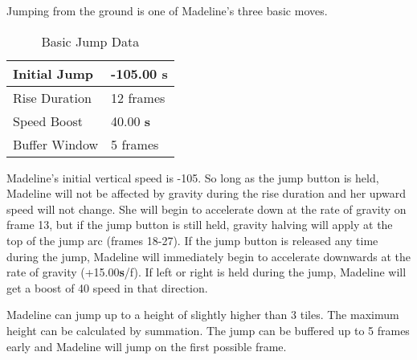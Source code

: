 \documentclass[oneside]{book}
\newcommand{\s}{\textbf{s}}
\begin{document}
Jumping from the ground is one of Madeline's three basic moves.

\begin{table}[h]
\begin{tabular}{|l|l|}
\hline
Initial Jump&-105.00 \s\\
\hline
Rise Duration&12 frames\\
\hline
Speed Boost&40.00 \s\\

\hline
Buffer Window&5 frames\\
\hline
\end{tabular} 
\caption{Basic Jump Data}
\end{table}



\begin{comment}
\begin{table}[h]
\begin{tabular}{|l|l|}
\hline
Frame&Y Speed\\
\hline
1-12&-105.00 \s\\
\hline
13-17&+15.00 \s/f (to -30.00 \s)\\
\hline
18-21&+7.50 \s/f (to 0.00 \s)\\
\hline
22-27&+7.50 \s/f (to +45.00 \s)\\
\hline
28-34&+15.00 \s/f (to +150.00 \s)\\
\hline
35&+10.00 \s/f (to +160.00 \s)\\
\hline
35-38&+160.00 \s\\
\hline
39&Land\\
\hline
\end{tabular}
\caption{Vertical Jump Speeds}
\end{table}
\end{comment}

Madeline's initial vertical speed is -105. So long as the jump button is held, Madeline will not be affected by gravity during the rise duration and her upward speed will not change. She will begin to accelerate down at the rate of gravity on frame 13, but if the jump button is still held, gravity halving will apply at the top of the jump arc (frames 18-27). If the jump button is released any time during the jump, Madeline will immediately begin to accelerate downwards at the rate of gravity (+15.00\s /f). If left or right is held during the jump, Madeline will get a boost of 40 speed in that direction.

Madeline can jump up to a height of slightly higher than 3 tiles. The maximum height can be calculated by summation. The jump can be buffered up to 5 frames early and Madeline will jump on the first possible frame.
\end{document}
